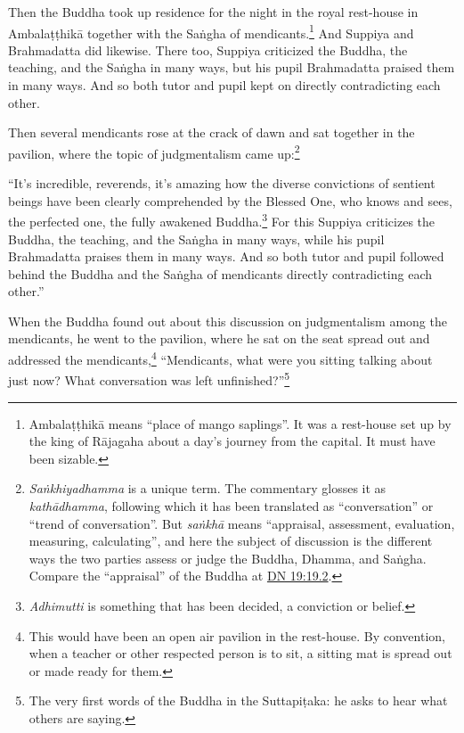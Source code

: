 \documentclass[12pt,openany]{book}%
\begin{document}
Then the Buddha took up residence for the night in the royal rest-house in \textsanskrit{Ambalaṭṭhikā} together with the \textsanskrit{Saṅgha} of mendicants.\footnote{\textsanskrit{Ambalaṭṭhikā} means “place of mango saplings”. It was a rest-house set up by the king of \textsanskrit{Rājagaha} about a day’s journey from the capital. It must have been sizable. } And Suppiya and Brahmadatta did likewise. There too, Suppiya criticized the Buddha, the teaching, and the \textsanskrit{Saṅgha} in many ways, but his pupil Brahmadatta praised them in many ways. And so both tutor and pupil kept on directly contradicting each other. 

Then several mendicants rose at the crack of dawn and sat together in the pavilion, where the topic of judgmentalism came up:\footnote{\textit{\textsanskrit{Saṅkhiyadhamma}} is a unique term. The commentary glosses it as \textit{\textsanskrit{kathādhamma}}, following which it has been translated as “conversation” or “trend of conversation”. But \textit{\textsanskrit{saṅkhā}} means “appraisal, assessment, evaluation, measuring, calculating”, and here the subject of discussion is the different ways the two parties assess or judge the Buddha, Dhamma, and \textsanskrit{Saṅgha}. Compare the “appraisal” of the Buddha at \href{https://suttacentral.net/dn19/en/sujato\#19.2}{DN 19:19.2}. } 

“It’s incredible, reverends, it’s amazing how the diverse convictions of sentient beings have been clearly comprehended by the Blessed One, who knows and sees, the perfected one, the fully awakened Buddha.\footnote{\textit{Adhimutti} is something that has been decided, a conviction or belief. } For this Suppiya criticizes the Buddha, the teaching, and the \textsanskrit{Saṅgha} in many ways, while his pupil Brahmadatta praises them in many ways. And so both tutor and pupil followed behind the Buddha and the \textsanskrit{Saṅgha} of mendicants directly contradicting each other.” 

When the Buddha found out about this discussion on judgmentalism among the mendicants, he went to the pavilion, where he sat on the seat spread out and addressed the mendicants,\footnote{This would have been an open air pavilion in the rest-house. By convention, when a teacher or other respected person is to sit, a sitting mat is spread out or made ready for them. } “Mendicants, what were you sitting talking about just now? What conversation was left unfinished?”\footnote{The very first words of the Buddha in the \textsanskrit{Suttapiṭaka}: he asks to hear what others are saying. } 
\end{document}
